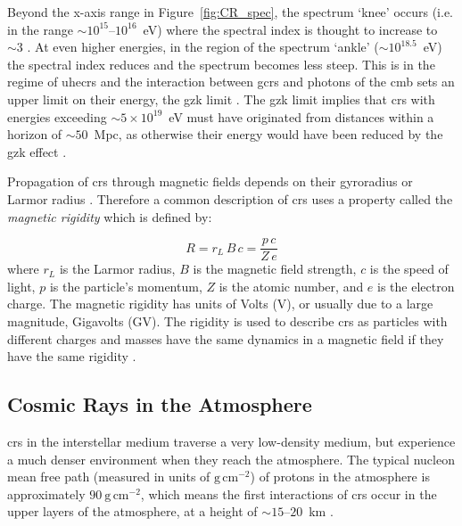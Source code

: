 Beyond the x-axis range in Figure~\ref{fig:CR_spec}, the spectrum `knee' occurs (i.e. in the range $\sim10^{15}$--$10^{16}$~eV) where the spectral index is thought to increase to $\sim3$ \citep{particle_data_group_review_2020}. At even higher energies, in the region of the spectrum `ankle' ($\sim10^{18.5}$~eV) the spectral index reduces and the spectrum becomes less steep. This is in the regime of \glspl{uhecr} and the interaction between \glspl{gcr} and photons of the \gls{cmb} sets an upper limit on their energy, the \gls{gzk} limit \citep{particle_data_group_review_2020}. The \gls{gzk} limit implies that \glspl{cr} with energies exceeding $\sim5\times10^{19}$~eV must have originated from distances within a horizon of $\sim50$~Mpc, as otherwise their energy would have been reduced by the \gls{gzk} effect \citep{particle_data_group_review_2020}. 


Propagation of \glspl{cr} through magnetic fields depends on their gyroradius or Larmor radius \citep{particle_data_group_review_2020}. Therefore a common description of \glspl{cr} uses a property called the {\textit{magnetic rigidity}} which is defined by:

\begin{equation}
\label{eq:rigidity}
R = r_L \, B \, c = \frac{p \, c}{Z \, e}
\end{equation}
%
where $r_L$ is the Larmor radius, $B$ is the magnetic field strength, $c$ is the speed of light, $p$ is the particle's momentum, $Z$ is the atomic number, and $e$ is the electron charge. The magnetic rigidity has units of Volts (V), or usually due to a large magnitude, Gigavolts (GV). The rigidity is used to describe \glspl{cr} as particles with different charges and masses have the same dynamics in a magnetic field if they have the same rigidity \citep{particle_data_group_review_2020}.



\subsection{Cosmic Rays in the Atmosphere}
\label{sec:air_shower}

\glspl{cr} in the interstellar medium traverse a very low-density medium, but experience a much denser environment when they reach the atmosphere. The typical nucleon mean free path (measured in units of $\mathrm{g}\,\mathrm{cm}^{-2}$) of protons in the atmosphere is approximately $90~\mathrm{g}\,\mathrm{cm}^{-2}$, which means the first interactions of \glspl{cr} occur in the upper layers of the atmosphere, at a height of $\sim15$--$20$~km \citep{grupen_astroparticle_2005}. %

